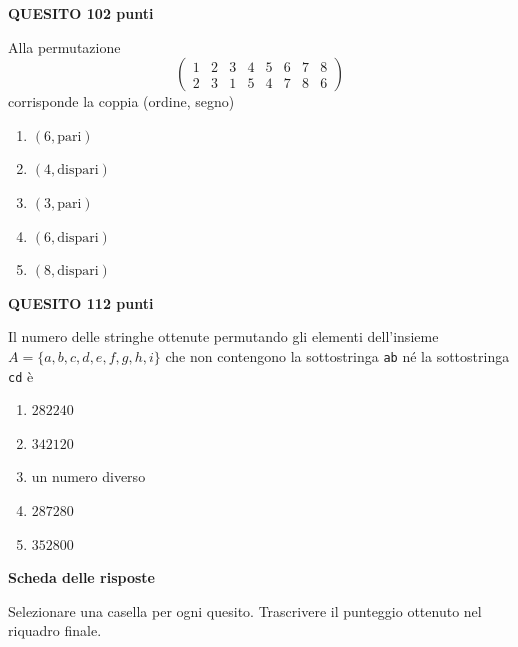 \documentclass[11pt,a4paper]{article}
\newcommand{\quesito}[2]{%
    \par\addvspace{0.55em}%
    \noindent\colorbox{examPale}{%
        \parbox{\dimexpr\linewidth-2\fboxsep\relax}{%
            \color{examNavy}\textbf{QUESITO #1}\hfill\textbf{#2 punti}}}%
    \par\nobreak\vspace{0.15em}%
}
\begin{document}
\begin{samepage}
\quesito{10}{2}
Alla permutazione
\[
    \begin{pmatrix}
        1&2&3&4&5&6&7&8\\
        2&3&1&5&4&7&8&6
    \end{pmatrix}
\]
corrisponde la coppia (ordine, segno)
\begin{enumerate}
    \item $(6,\text{pari})$
    \item $(4,\text{dispari})$
    \item $(3,\text{pari})$
    \item $(6,\text{dispari})$
    \item $(8,\text{dispari})$
\end{enumerate}
\end{samepage}

\begin{samepage}
\quesito{11}{2}
Il numero delle stringhe ottenute permutando gli elementi dell'insieme
$A=\{a,b,c,d,e,f,g,h,i\}$ che non contengono la sottostringa \texttt{ab}
n\'e la sottostringa \texttt{cd} \`e
\begin{enumerate}
    \item $282240$
    \item $342120$
    \item un numero diverso
    \item $287280$
    \item $352800$
\end{enumerate}
\end{samepage}

\clearpage
\begin{center}
    {\Large\bfseries\color{examNavy} Scheda delle risposte}
\end{center}
Selezionare una casella per ogni quesito. Trascrivere il punteggio ottenuto
nel riquadro finale.
\end{document}
